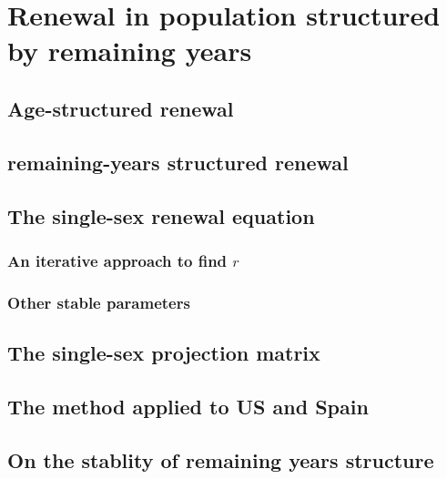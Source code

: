 \chapter{Renewal in population structured by remaining years}
    
    \section{Age-structured renewal}
      
    
    \section{remaining-years structured renewal}
      
    
    \section{The single-sex renewal equation}
      
      
      \subsection{An iterative approach to find $r$}
        
        
      \subsection{Other stable parameters}
        
      
    \section{The single-sex projection matrix}
      

    \section{The method applied to US and Spain}
      

    \section{On the stablity of remaining years structure}
      
      
